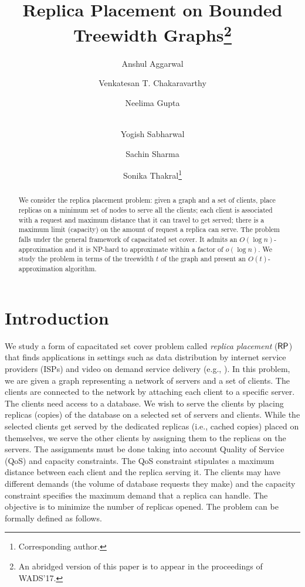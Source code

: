\documentclass[11pt]{article}
\newcommand{\RP} {{\sf RP}}
\begin{document}
\title{Replica Placement on Bounded Treewidth Graphs\thanks{An abridged version of this paper is to appear in the proceedings of WADS'17.}}
\author[1]{Anshul Aggarwal}
\author[2]{Venkatesan T. Chakaravarthy}
\author[1]{Neelima Gupta}
\author[2]{\\Yogish Sabharwal}
\author[1]{Sachin Sharma}
\author[1]{Sonika Thakral\thanks{Corresponding author.}}

\maketitle

\maketitle          

\begin{abstract}
We consider the replica placement problem:
given a graph and a set of clients, place replicas on a minimum set of nodes to serve all the clients; 
each client is associated with a request and maximum distance that it can travel to get 
served; there is a maximum limit (capacity)
on the amount of request a replica can serve. 
The problem falls under the general framework of capacitated set cover.
It admits an $O(\log n)$-approximation and it is 
NP-hard to approximate within a factor of $o(\log n)$.
We study the problem in terms of the treewidth $t$ of the graph 
and present an $O(t)$-approximation algorithm.
\end{abstract}

\section{Introduction}
We study a form of capacitated set cover problem \cite{Chuzhoy} called  {\em replica placement} ($\RP$) that finds
applications in settings such as data distribution by internet service providers (ISPs) and 
video on demand service delivery (e.g., \cite{1,4}).
In this problem, we are given a graph representing a network of servers and a set of clients.
The clients are connected to the network by attaching each client to a specific server.
The clients need access to a database. 
We wish to serve the clients by placing replicas (copies) of the database on a selected set of servers and clients.
While the selected clients get served by the dedicated replicas (i.e., cached copies) placed on themselves,
we serve the other clients by assigning them to the replicas on the servers.
The assignments must be done taking into account Quality of Service (QoS) and capacity constraints.
The QoS constraint stipulates a maximum distance between each client and the replica serving it.
The clients may have different demands (the volume of database requests they make)
and the capacity constraint specifies the maximum demand that a replica can handle.
The objective is to minimize the number of replicas opened.
The problem can be formally defined as follows.
\end{document}

